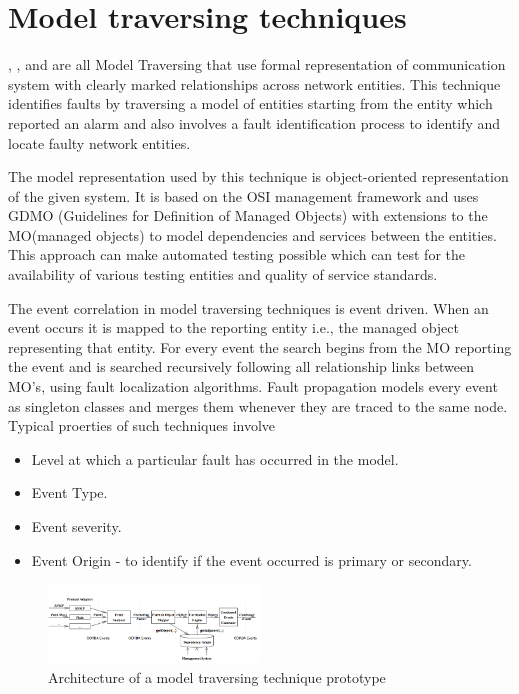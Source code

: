 \documentclass[10pt]{sigplan-proc-varsize}
\begin{document}
\section{Model traversing techniques}
\cite{Katker:96}, \cite{Katker:971}, \cite{Katker:97} and \cite{Gruschke:98} are all Model Traversing that use formal representation of communication 
system with clearly marked relationships across network entities. This technique identifies faults by traversing a model of entities starting from the entity which reported an alarm and also involves a fault identification process to identify and locate faulty network entities.

The model representation used by this technique is object-oriented representation of the given system. It is based on the OSI management framework and uses GDMO (Guidelines for  Definition  of Managed Objects) with extensions to the MO(managed objects) to model dependencies and services between the entities. This approach can make automated testing possible which can test for the availability of various testing entities and quality of service standards.

The event correlation in model traversing techniques is event driven. When an event occurs it is mapped to the reporting entity i.e., the managed object representing that entity. For every event the search begins from the MO reporting the event and is searched recursively following all relationship links between MO's, using fault localization algorithms. Fault propagation models every event as singleton classes and merges them whenever they are traced to the same node. Typical proerties of such techniques involve 

\begin{itemize}
  \item Level at which a particular fault has occurred in the model.
  \item Event Type.
  \item Event severity.
  \item Event Origin - to identify if the event occurred is primary or secondary.
\end{itemize}

\begin{figure}[h!]
  \caption{Architecture of a model traversing technique prototype}
  \centering
    \includegraphics[width=0.5\textwidth]{Fig3}
\end{figure}
\end{document}
